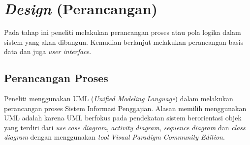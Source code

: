 	\section{\emph{Design} (Perancangan)}
	Pada tahap ini peneliti melakukan perancangan proses atau pola logika dalam sistem yang akan dibangun. Kemudian berlanjut melakukan perancangan basis data dan juga \emph{user interface}.

		\subsection{Perancangan Proses}
			Peneliti menggunakan UML (\emph{Unified Modeling Language}) dalam melakukan perancangan proses Sistem Informasi Penggajian. Alasan memilih menggunakan UML adalah karena UML berfokus pada pendekatan sistem berorientasi objek yang terdiri dari \emph{use case diagram}, \emph{activity diagram}, \emph{sequence diagram} dan \emph{class diagram} dengan menggunakan \emph{tool} \emph{Visual Paradigm Community Edition}.
			
